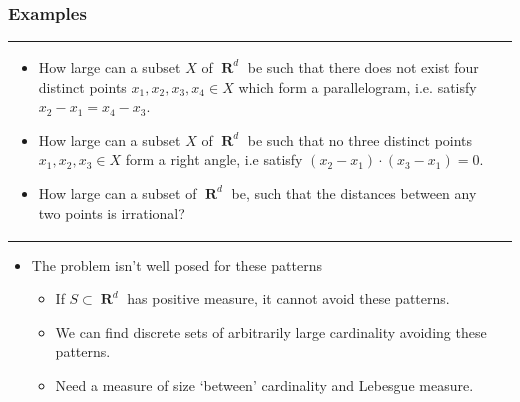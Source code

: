 \documentclass[usenames,dvipsnames,handout]{beamer}
\DeclareMathOperator{\RR}{\textbf{R}}
\DeclareMathOperator{\QQ}{\textbf{Q}}
\begin{document}
\begin{frame}
  \frametitle{Examples}

\begin{tabular}{p{}p{}}

\begin{itemize}
    \pause
    \item How large can a subset $X$ of $\RR^d$ be such that there does not exist four distinct points $x_1,x_2,x_3,x_4 \in X$ which form a parallelogram, i.e. satisfy $x_2 - x_1 = x_4 - x_3$.

    \pause
    \item How large can a subset $X$ of $\RR^d$ be such that no three distinct points $x_1,x_2,x_3 \in X$ form a right angle, i.e satisfy $(x_2 - x_1) \cdot (x_3 - x_1) = 0$.

    \item How large can a subset of $\RR^d$ be, such that the distances between any two points is irrational?


\end{itemize}

\end{tabular}
\end{frame}





\begin{frame}

\begin{itemize}
    \item The problem isn't well posed for these patterns
    \begin{itemize}
        \item If $S \subset \RR^d$ has positive measure, it cannot avoid these patterns.
        \item We can find discrete sets of arbitrarily large cardinality avoiding these patterns.
        \item Need a measure of size `between' cardinality and Lebesgue measure.
    \end{itemize}
\end{itemize}

\end{frame}
\end{document}

